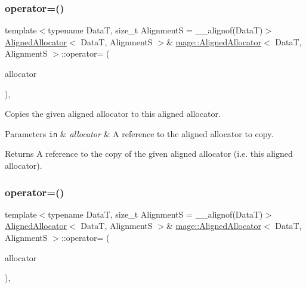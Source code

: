 \subsubsection{\texorpdfstring{operator=()}{operator=()}\hspace{0.1cm}{\footnotesize\ttfamily [1/2]}}
{\footnotesize\ttfamily template$<$typename DataT, size\+\_\+t AlignmentS = \+\_\+\+\_\+alignof(\+Data\+T)$>$ \\
\hyperlink{structmage_1_1_aligned_allocator}{Aligned\+Allocator}$<$ DataT, AlignmentS $>$\& \hyperlink{structmage_1_1_aligned_allocator}{mage\+::\+Aligned\+Allocator}$<$ DataT, AlignmentS $>$\+::operator= (\begin{DoxyParamCaption}\item[{const \hyperlink{structmage_1_1_aligned_allocator}{Aligned\+Allocator}$<$ DataT, AlignmentS $>$ \&}]{allocator }\end{DoxyParamCaption})\hspace{0.3cm}{\ttfamily [delete]}, {\ttfamily [noexcept]}}

Copies the given aligned allocator to this aligned allocator.


\begin{DoxyParams}[1]{Parameters}
\mbox{\tt in}  & {\em allocator} & A reference to the aligned allocator to copy. \\
\hline
\end{DoxyParams}
\begin{DoxyReturn}{Returns}
A reference to the copy of the given aligned allocator (i.\+e. this aligned allocator). 
\end{DoxyReturn}
\hypertarget{structmage_1_1_aligned_allocator_a968996d679acfd7ce9d113bf33d31c91}{}\label{structmage_1_1_aligned_allocator_a968996d679acfd7ce9d113bf33d31c91} 
\subsubsection{\texorpdfstring{operator=()}{operator=()}\hspace{0.1cm}{\footnotesize\ttfamily [2/2]}}
{\footnotesize\ttfamily template$<$typename DataT, size\+\_\+t AlignmentS = \+\_\+\+\_\+alignof(\+Data\+T)$>$ \\
\hyperlink{structmage_1_1_aligned_allocator}{Aligned\+Allocator}$<$ DataT, AlignmentS $>$\& \hyperlink{structmage_1_1_aligned_allocator}{mage\+::\+Aligned\+Allocator}$<$ DataT, AlignmentS $>$\+::operator= (\begin{DoxyParamCaption}\item[{\hyperlink{structmage_1_1_aligned_allocator}{Aligned\+Allocator}$<$ DataT, AlignmentS $>$ \&\&}]{allocator }\end{DoxyParamCaption})\hspace{0.3cm}{\ttfamily [delete]}, {\ttfamily [noexcept]}}

